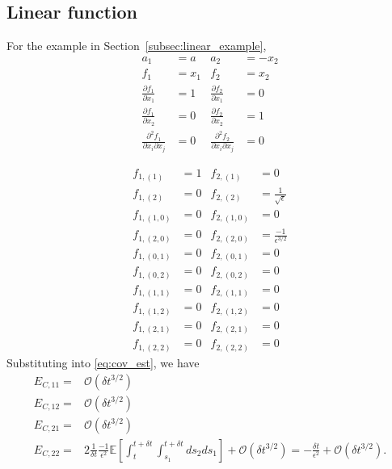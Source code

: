 \subsection{Linear function}

For the example in Section~\ref{subsec:linear_example}, 
\begin{equation}
\begin{aligned}
a_1 &= a 
&
a_2 &= -x_2
\\
f_1 &= x_1 
&
f_2 &= x_2 
\\
\frac{\partial f_1}{\partial x_1} &= 1
&
\frac{\partial f_2}{\partial x_1} &= 0 
\\
\frac{\partial f_1}{\partial x_2} &= 0
&
\frac{\partial f_2}{\partial x_2} &= 1 
\\
\frac{\partial^2 f_1}{\partial x_i \partial x_j} &= 0
&
\frac{\partial^2 f_2}{\partial x_i \partial x_j} &= 0
\end{aligned}
\end{equation}

\begin{equation}
\begin{aligned}
f_{1,(1)} &= 1
&
f_{2,(1)} &= 0
\\
f_{1,(2)} &= 0
&
f_{2,(2)} &= \frac{1}{\sqrt{\epsilon}}
\\
f_{1,(1,0)} &= 0
&
f_{2,(1,0)} &= 0
\\
f_{1,(2,0)} &= 0
&
f_{2,(2,0)} &= \frac{-1}{\epsilon^{3/2}} 
\\
f_{1,(0,1)} &= 0
&
f_{2,(0,1)} &= 0
\\
f_{1,(0,2)} &= 0
&
f_{2,(0,2)} &= 0
\\
f_{1,(1,1)} &= 0
&
f_{2,(1,1)} &= 0
\\
f_{1,(1,2)} &= 0
&
f_{2,(1,2)} &= 0
\\
f_{1,(2,1)} &= 0
&
f_{2,(2,1)} &= 0
\\
f_{1,(2,2)} &= 0
&
f_{2,(2,2)} &= 0
\end{aligned}
\end{equation}
%
Substituting into \eqref{eq:cov_est}, we have
\begin{equation}
\begin{aligned}
E_{C, 11} =& \mathcal{O} (\delta t^{3/2}) \\
E_{C,12} =& \mathcal{O} (\delta t^{3/2}) \\
E_{C,21} =& \mathcal{O} (\delta t^{3/2}) \\
E_{C,22} =&
2 \frac{1}{\delta t}\frac{-1}{\epsilon^2} \mathbb{E} \left[ \int_t^{t+\delta t} \int_{s_1}^{t+\delta t} ds_2 ds_1 \right] + \mathcal{O} (\delta t^{3/2})
= - \frac{\delta t}{\epsilon^2} + \mathcal{O} (\delta t^{3/2}) .
\end{aligned}
\end{equation}

